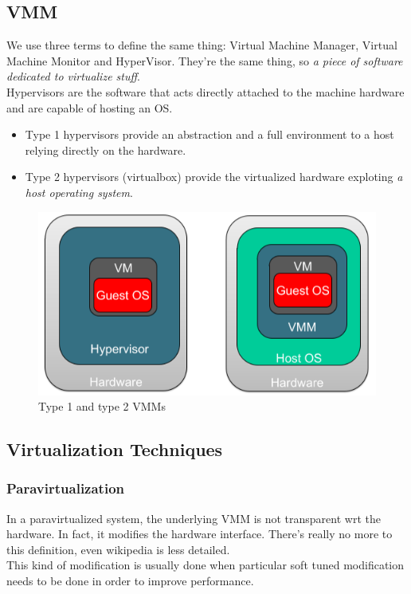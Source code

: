 \documentclass[10pt,a4paper]{article}
\begin{document}
			\subsection{VMM}
				We use three terms to define the same thing: Virtual Machine Manager, Virtual Machine Monitor and HyperVisor. They're the same thing, so \emph{a piece of software dedicated to virtualize stuff}.\\
				Hypervisors are the software that acts directly attached to the machine hardware and are capable of hosting an OS.
				\begin{itemize}
					\item Type 1 hypervisors provide an abstraction and a full environment to a host relying directly on the hardware.
					\item Type 2 hypervisors (virtualbox) provide the virtualized hardware exploting \emph{a host operating system}.
				\end{itemize}
				\begin{figure}[H]
					\centering
					\includegraphics[width = \textwidth]{./images/VMMs.png}
					\caption{Type 1 and type 2 VMMs}
				\end{figure}
				
			\subsection{Virtualization Techniques}
				\subsubsection{Paravirtualization}
					In a paravirtualized system, the underlying VMM is not transparent wrt the hardware. In fact, it modifies the hardware interface. There's really no more to this definition, even wikipedia is less detailed.\\
					This kind of modification is usually done when particular soft tuned modification needs to be done in order to improve performance.
				
\end{document}
